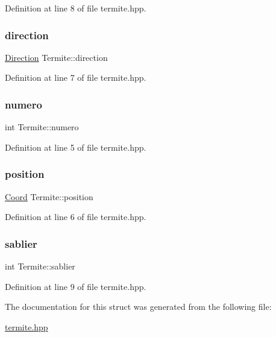 Definition at line 8 of file termite.\+hpp.

\mbox{\label{structTermite_ac9efb06efee1f16991a1d7fea6d38b83}} 
\subsubsection{\texorpdfstring{direction}{direction}}
{\footnotesize\ttfamily \hyperlink{coord_8hpp_a224b9163917ac32fc95a60d8c1eec3aa}{Direction} Termite\+::direction}



Definition at line 7 of file termite.\+hpp.

\mbox{\label{structTermite_a46adc25bf86ecdb46da04691190e680e}} 
\subsubsection{\texorpdfstring{numero}{numero}}
{\footnotesize\ttfamily int Termite\+::numero}



Definition at line 5 of file termite.\+hpp.

\mbox{\label{structTermite_ab15e5a7c1ffc20223c2bf9d158509a06}} 
\subsubsection{\texorpdfstring{position}{position}}
{\footnotesize\ttfamily \hyperlink{structCoord}{Coord} Termite\+::position}



Definition at line 6 of file termite.\+hpp.

\mbox{\label{structTermite_a708e35f65d0dada0f662f0212aefcea9}} 
\subsubsection{\texorpdfstring{sablier}{sablier}}
{\footnotesize\ttfamily int Termite\+::sablier}



Definition at line 9 of file termite.\+hpp.



The documentation for this struct was generated from the following file\+:\begin{DoxyCompactItemize}
\item 
\hyperlink{termite_8hpp}{termite.\+hpp}\end{DoxyCompactItemize}
